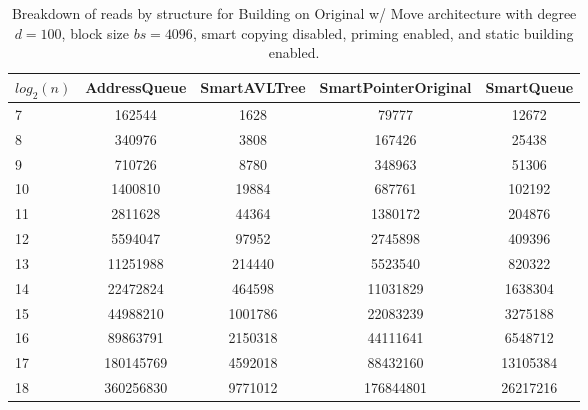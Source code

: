 \begin{table}[]
\centering
\begin{tabular}{|l|c|c|c|c|}
$log_2(n)$ & AddressQueue & SmartAVLTree & SmartPointerOriginal & SmartQueue \\ \hline
7 & 162544 & 1628 & 79777 & 12672 \\ \hline
8 & 340976 & 3808 & 167426 & 25438 \\ \hline
9 & 710726 & 8780 & 348963 & 51306 \\ \hline
10 & 1400810 & 19884 & 687761 & 102192 \\ \hline
11 & 2811628 & 44364 & 1380172 & 204876 \\ \hline
12 & 5594047 & 97952 & 2745898 & 409396 \\ \hline
13 & 11251988 & 214440 & 5523540 & 820322 \\ \hline
14 & 22472824 & 464598 & 11031829 & 1638304 \\ \hline
15 & 44988210 & 1001786 & 22083239 & 3275188 \\ \hline
16 & 89863791 & 2150318 & 44111641 & 6548712 \\ \hline
17 & 180145769 & 4592018 & 88432160 & 13105384 \\ \hline
18 & 360256830 & 9771012 & 176844801 & 26217216 \\ \hline
\end{tabular}
\caption{Breakdown of reads by structure for Building on Original w/ Move architecture with degree $d=100$, block size $bs=4096$, smart copying disabled, priming enabled, and static building enabled.}
    \label{tab:reads_by_structure_build_d100_bs4096_copiesfalse_primetrue_staticinsertiontrue_ptoriginal_movetrue}
\end{table}

